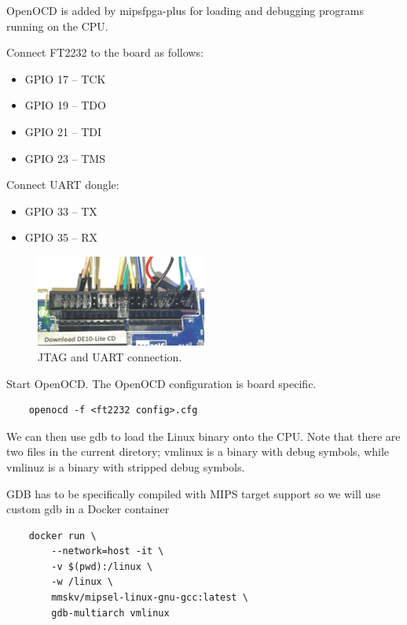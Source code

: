 \documentclass[a4paper]{article}
\begin{document}
OpenOCD is added by mipsfpga-plus for loading and debugging programs running on the CPU.

Connect FT2232 to the board as follows:

\begin{itemize}
    \itemsep0em
    \item GPIO 17 -- TCK
    \item GPIO 19 -- TDO
    \item GPIO 21 -- TDI
    \item GPIO 23 -- TMS
\end{itemize}

Connect UART dongle:

\begin{itemize}
    \itemsep0em
    \item GPIO 33 -- TX
    \item GPIO 35 -- RX
\end{itemize}

\begin{figure}[H]
    \centering
    \includegraphics[width=0.5\textwidth]{uart-jtag.jpg}
    \captionsetup{width=0.8\textwidth}
    \caption{JTAG and UART connection.}
\end{figure}

Start OpenOCD. The OpenOCD configuration is board specific.

\begin{lstlisting}
    openocd -f <ft2232 config>.cfg
\end{lstlisting}

We can then use gdb to load the Linux binary onto the CPU. Note that there are
two files in the current diretory; vmlinux is a binary with debug symbols,
while vmlinuz is a binary with stripped debug symbols.

GDB has to be specifically compiled with MIPS target support so we will use custom gdb in a Docker container

\begin{lstlisting}
    docker run \
        --network=host -it \
        -v $(pwd):/linux \
        -w /linux \
        mmskv/mipsel-linux-gnu-gcc:latest \
        gdb-multiarch vmlinux
\end{lstlisting}
\end{document}
